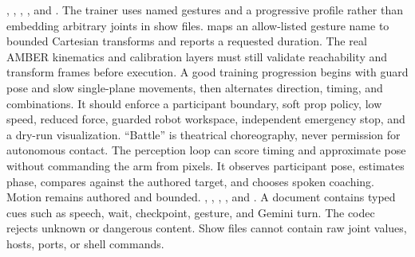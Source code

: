 {}
\markdownRendererSectionEnd \markdownRendererSectionBegin
{}\markdownRendererInterblockSeparator
{}\markdownRendererBlockQuoteBegin
{} , , , , and .\markdownRendererBlockQuoteEnd \markdownRendererInterblockSeparator
{}The trainer uses named gestures and a progressive profile rather than embedding arbitrary joints in show files.  maps an allow-listed gesture name to bounded Cartesian transforms and reports a requested duration. The real AMBER kinematics and calibration layers must still validate reachability and transform frames before execution.\markdownRendererParagraphSeparator
{}A good training progression begins with guard pose and slow single-plane movements, then alternates direction, timing, and combinations. It should enforce a participant boundary, soft prop policy, low speed, reduced force, guarded robot workspace, independent emergency stop, and a dry-run visualization. “Battle” is theatrical choreography, never permission for autonomous contact.\markdownRendererParagraphSeparator
{}The perception loop can score timing and approximate pose without commanding the arm from pixels. It observes participant pose, estimates phase, compares against the authored target, and chooses spoken coaching. Motion remains authored and bounded.\markdownRendererInterblockSeparator
{}
\markdownRendererSectionEnd \markdownRendererSectionBegin
{}\markdownRendererInterblockSeparator
{}\markdownRendererBlockQuoteBegin
{} , , , , and .\markdownRendererBlockQuoteEnd \markdownRendererInterblockSeparator
{}A  document contains typed cues such as speech, wait, checkpoint, gesture, and Gemini turn. The codec rejects unknown or dangerous content. Show files cannot contain raw joint values, hosts, ports, or shell commands.\markdownRendererParagraphSeparator
